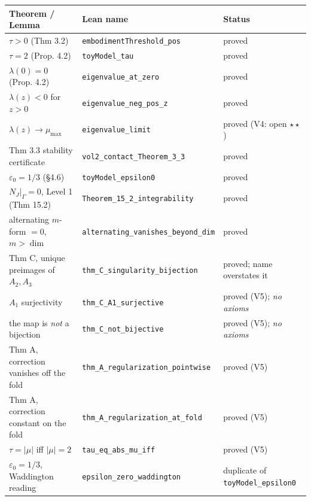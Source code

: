 \documentclass[11pt]{article}
\theoremstyle{boxed}
\begin{document}
{\small
\begin{longtable}{@{}>{\raggedright\arraybackslash}p{} >{\raggedright\arraybackslash}p{} >{\raggedright\arraybackslash}p{}@{}}
\toprule
\textbf{Theorem / Lemma} & \textbf{Lean name} & \textbf{Status}\\
\midrule
\endhead
$\tau > 0$ (Thm 3.2)                     & \texttt{embodimentThreshold\_pos}       & proved\\
$\tau = 2$ (Prop. 4.2)                   & \texttt{toyModel\_tau}                  & proved\\
$\lambda(0) = 0$ (Prop. 4.2)             & \texttt{eigenvalue\_at\_zero}           & proved\\
$\lambda(z) < 0$ for $z>0$               & \texttt{eigenvalue\_neg\_pos\_z}        & proved\\
$\lambda(z) \to \mu_{\max}$              & \texttt{eigenvalue\_limit}              & proved (V4: open $\star\star$)\\
Thm 3.3 stability certificate            & \texttt{vol2\_contact\_Theorem\_3\_3}   & proved\\
$\varepsilon_0 = 1/3$ (\S 4.6)           & \texttt{toyModel\_epsilon0}             & proved\\
$N_J|_\Gamma = 0$, Level 1 (Thm 15.2)    & \texttt{Theorem\_15\_2\_integrability}  & proved\\
alternating $m$-form $=0$, $m>\dim$      & \texttt{alternating\_vanishes\_beyond\_dim} & proved\\
Thm C, unique preimages of $A_2, A_3$    & \texttt{thm\_C\_singularity\_bijection} & proved; name overstates it\\
$A_1$ surjectivity                       & \texttt{thm\_C\_A1\_surjective}         & proved (V5); \emph{no axioms}\\
the map is \emph{not} a bijection        & \texttt{thm\_C\_not\_bijective}         & proved (V5); \emph{no axioms}\\
Thm A, correction vanishes off the fold  & \texttt{thm\_A\_regularization\_pointwise} & proved (V5)\\
Thm A, correction constant on the fold   & \texttt{thm\_A\_regularization\_at\_fold}  & proved (V5)\\
$\tau = |\mu|$ iff $|\mu| = 2$           & \texttt{tau\_eq\_abs\_mu\_iff}          & proved (V5)\\
$\varepsilon_0=1/3$, Waddington reading  & \texttt{epsilon\_zero\_waddington}      & duplicate of \texttt{toyModel\_epsilon0}\\

\end{longtable}}
\end{document}
